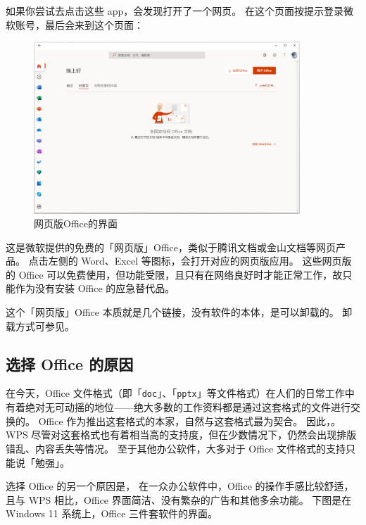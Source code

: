 如果你尝试去点击这些 app，会发现打开了一个网页。
在这个页面按提示登录微软账号，最后会来到这个页面：

\begin{figure}[htb!]
  \centering
  \includegraphics[width=10cm]{assets/Office_Web.png}
  \caption{网页版Office的界面}
  \label{Office_Web}
\end{figure}

这是微软提供的免费的「网页版」Office，类似于腾讯文档或金山文档等网页产品。
点击左侧的 Word、Excel 等图标，会打开对应的网页版应用。
这些网页版的 Office 可以免费使用，但功能受限，且只有在网络良好时才能正常工作，故只能作为没有安装 Office 的应急替代品。

这个「网页版」Office 本质就是几个链接，没有软件的本体，是可以卸载的。
卸载方式可参见。

\subsection{选择 Office 的原因}

在今天，Office 文件格式（即「\verb|doc|」、「\verb|pptx|」等文件格式）在人们的日常工作中有着绝对无可动摇的地位——绝大多数的工作资料都是通过这套格式的文件进行交换的。
Office 作为推出这套格式的本家，自然与这套格式最为契合。
因此，。
WPS 尽管对这套格式也有着相当高的支持度，但在少数情况下，仍然会出现排版错乱、内容丢失等情况。
至于其他办公软件，大多对于 Office 文件格式的支持只能说「勉强」。

选择 Office 的另一个原因是，
在一众办公软件中，Office 的操作手感比较舒适，且与 WPS 相比，Office 界面简洁、没有繁杂的广告和其他多余功能。
下图是在 Windows 11 系统上，Office 三件套软件的界面。

